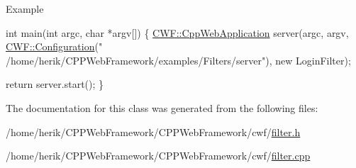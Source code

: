 \begin{DoxyParagraph}{Example}
\begin{DoxyCode}
\textcolor{keywordtype}{int} main(\textcolor{keywordtype}{int} argc, \textcolor{keywordtype}{char} *argv[])
\{
    \hyperlink{class_c_w_f_1_1_cpp_web_application}{CWF::CppWebApplication} server(argc,
                                  argv,
                                  \hyperlink{class_c_w_f_1_1_configuration}{CWF::Configuration}(\textcolor{stringliteral}{"
      /home/herik/CPPWebFramework/examples/Filters/server"}),
                                  \textcolor{keyword}{new} LoginFilter);

    \textcolor{keywordflow}{return} server.start();
\}
\end{DoxyCode}
 
\end{DoxyParagraph}


The documentation for this class was generated from the following files\+:\begin{DoxyCompactItemize}
\item 
/home/herik/\+C\+P\+P\+Web\+Framework/\+C\+P\+P\+Web\+Framework/cwf/\hyperlink{filter_8h}{filter.\+h}\item 
/home/herik/\+C\+P\+P\+Web\+Framework/\+C\+P\+P\+Web\+Framework/cwf/\hyperlink{filter_8cpp}{filter.\+cpp}\end{DoxyCompactItemize}
